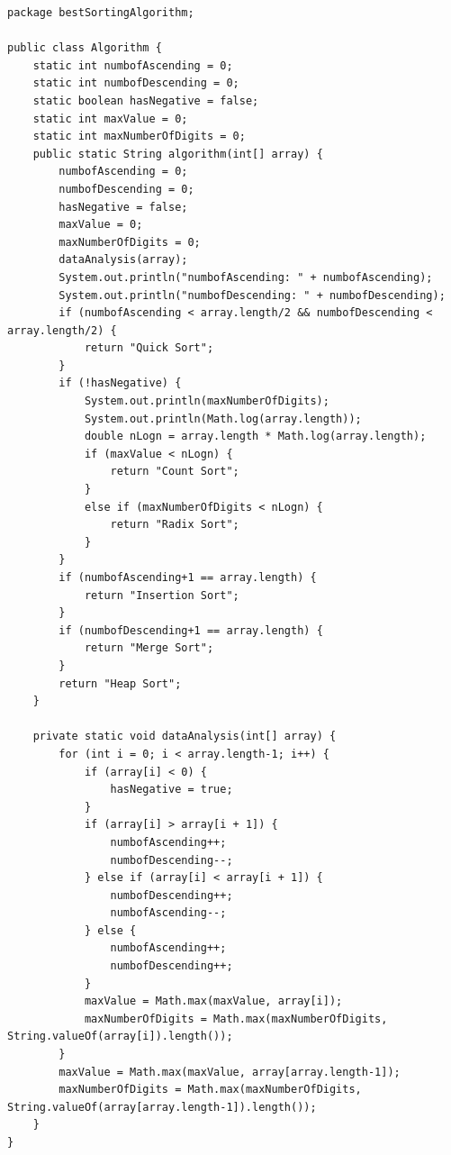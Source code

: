 \documentclass[
10pt, %
a4paper, %
oneside, %
headinclude,footinclude, %
BCOR5mm, %
]{scrartcl}
\begin{document}
\begin{lstlisting}
package bestSortingAlgorithm;

public class Algorithm {
    static int numbofAscending = 0;
    static int numbofDescending = 0;
    static boolean hasNegative = false;
    static int maxValue = 0;
    static int maxNumberOfDigits = 0;
    public static String algorithm(int[] array) {
        numbofAscending = 0;
        numbofDescending = 0;
        hasNegative = false;
        maxValue = 0;
        maxNumberOfDigits = 0;
        dataAnalysis(array);
        System.out.println("numbofAscending: " + numbofAscending);
        System.out.println("numbofDescending: " + numbofDescending);
        if (numbofAscending < array.length/2 && numbofDescending < array.length/2) {
            return "Quick Sort";
        }
        if (!hasNegative) {
            System.out.println(maxNumberOfDigits);
            System.out.println(Math.log(array.length));
            double nLogn = array.length * Math.log(array.length);
            if (maxValue < nLogn) {
                return "Count Sort";
            }
            else if (maxNumberOfDigits < nLogn) {
                return "Radix Sort";
            }
        }
        if (numbofAscending+1 == array.length) {
            return "Insertion Sort";
        }
        if (numbofDescending+1 == array.length) {
            return "Merge Sort";
        }
        return "Heap Sort";
    }

    private static void dataAnalysis(int[] array) {
        for (int i = 0; i < array.length-1; i++) {
            if (array[i] < 0) {
                hasNegative = true;
            }
            if (array[i] > array[i + 1]) {
                numbofAscending++;
                numbofDescending--;
            } else if (array[i] < array[i + 1]) {
                numbofDescending++;
                numbofAscending--;
            } else {
                numbofAscending++;
                numbofDescending++;
            }
            maxValue = Math.max(maxValue, array[i]);
            maxNumberOfDigits = Math.max(maxNumberOfDigits, String.valueOf(array[i]).length());
        }
        maxValue = Math.max(maxValue, array[array.length-1]);
        maxNumberOfDigits = Math.max(maxNumberOfDigits, String.valueOf(array[array.length-1]).length());
    }
}

\end{lstlisting}
\end{document}
